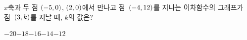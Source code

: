 $x$축과 두 점 $(-5{,}\mkern3mu\mathopen{}0)$, $(2{,}\mkern3mu\mathopen{}0)$에서 만나고 점~$(-4{,}\mkern3mu\mathopen{}12)$를 지나는 이차함수의 그래프가 점~$(3{,}\mkern3mu\mathopen{}k)$를 지날 때, $k$의 값은?
\begin{choices32}{$-20$}{$-18$}{$-16$}{$-14$}{$-12$}\end{choices32}
